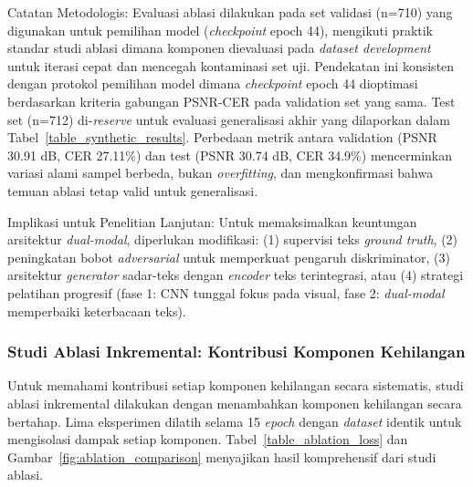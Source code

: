 \documentclass[journal]{IEEEtran}
\begin{document}
Catatan Metodologis: Evaluasi ablasi dilakukan pada set validasi (n=710) yang digunakan untuk pemilihan model (\textit{checkpoint} epoch 44), mengikuti praktik standar studi ablasi dimana komponen dievaluasi pada \textit{dataset development} untuk iterasi cepat dan mencegah kontaminasi set uji. Pendekatan ini konsisten dengan protokol pemilihan model dimana \textit{checkpoint} epoch 44 dioptimasi berdasarkan kriteria gabungan PSNR-CER pada validation set yang sama. Test set (n=712) di-\textit{reserve} untuk evaluasi generalisasi akhir yang dilaporkan dalam Tabel~\ref{table_synthetic_results}. Perbedaan metrik antara validation (PSNR 30.91 dB, CER 27.11\%) dan test (PSNR 30.74 dB, CER 34.9\%) mencerminkan variasi alami sampel berbeda, bukan \textit{overfitting}, dan mengkonfirmasi bahwa temuan ablasi tetap valid untuk generalisasi.

Implikasi untuk Penelitian Lanjutan: Untuk memaksimalkan keuntungan arsitektur \textit{dual-modal}, diperlukan modifikasi: (1) supervisi teks \textit{ground truth}, (2) peningkatan bobot \textit{adversarial} untuk memperkuat pengaruh diskriminator, (3) arsitektur \textit{generator} sadar-teks dengan \textit{encoder} teks terintegrasi, atau (4) strategi pelatihan progresif (fase 1: CNN tunggal fokus pada visual, fase 2: \textit{dual-modal} memperbaiki keterbacaan teks).

\subsubsection{Studi Ablasi Inkremental: Kontribusi Komponen Kehilangan}

Untuk memahami kontribusi setiap komponen kehilangan secara sistematis, studi ablasi inkremental dilakukan dengan menambahkan komponen kehilangan secara bertahap. Lima eksperimen dilatih selama 15 \textit{epoch} dengan \textit{dataset} identik untuk mengisolasi dampak setiap komponen. Tabel~\ref{table_ablation_loss} dan Gambar~\ref{fig:ablation_comparison} menyajikan hasil komprehensif dari studi ablasi.
\end{document}
